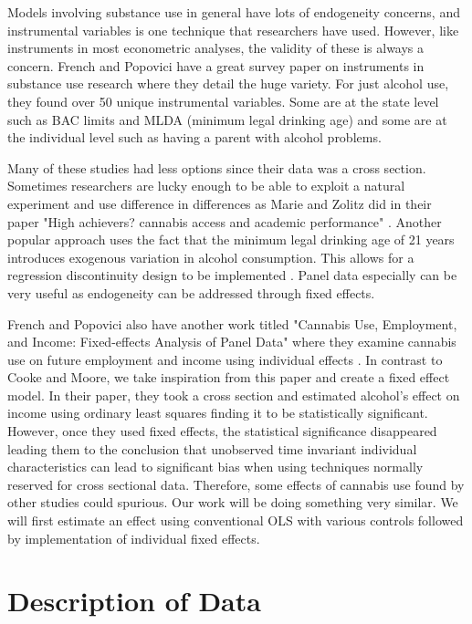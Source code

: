 \documentclass[11pt]{article}
\begin{document}
Models involving substance use in general have lots of endogeneity concerns, and instrumental variables is one technique that researchers have used. However, like instruments in most econometric analyses, the validity of these is always a concern. French and Popovici have a great survey paper on instruments in substance use research where they detail the huge variety. For just alcohol use, they found over 50 unique instrumental variables. Some are at the state level such as BAC limits and MLDA (minimum legal drinking age) and some are at the individual level such as having a parent with alcohol problems. \cite{french2011instrument} 

Many of these studies had less options since their data was a cross section. Sometimes researchers are lucky enough to be able to exploit a natural experiment and use difference in differences as Marie and Zolitz did in their paper "High achievers?  cannabis access and academic  performance" \cite{high_achievers}. Another popular approach uses the fact that the minimum legal drinking age of 21 years introduces exogenous variation in alcohol consumption. This allows for a regression discontinuity design to be implemented \cite{Deza} \cite{CROST}. Panel data especially can be very useful as endogeneity can be addressed through fixed effects. 

French and Popovici also have another work titled "Cannabis Use, Employment, and Income: Fixed-effects Analysis of Panel Data" where they examine cannabis use on future employment and income using individual effects \cite{popovici2014cannabis}. In contrast to Cooke and Moore, we take inspiration from this paper and create a fixed effect model. In their paper, they took a cross section and estimated alcohol's effect on income using ordinary least squares finding it to be statistically significant. However, once they used fixed effects, the statistical significance disappeared leading them to the conclusion that unobserved time invariant individual characteristics can lead to significant bias when using techniques normally reserved for cross sectional data. Therefore, some effects of cannabis use found by other studies could spurious. Our work will be doing something very similar. We will first estimate an effect using conventional OLS with various controls followed by implementation of individual fixed effects.


\section*{Description of Data}
\end{document}
